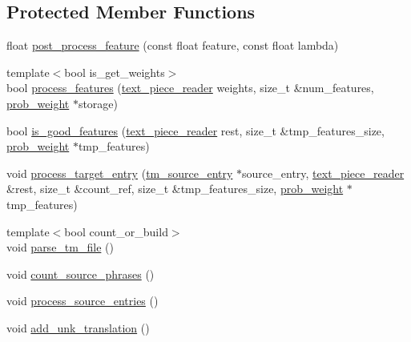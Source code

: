 \subsection*{Protected Member Functions}
\begin{DoxyCompactItemize}
\item 
float \hyperlink{classuva_1_1smt_1_1bpbd_1_1server_1_1tm_1_1builders_1_1tm__basic__builder_a55ed944c97e2e9896b6ada55899b9828}{post\+\_\+process\+\_\+feature} (const float feature, const float lambda)
\item 
{\footnotesize template$<$bool is\+\_\+get\+\_\+weights$>$ }\\bool \hyperlink{classuva_1_1smt_1_1bpbd_1_1server_1_1tm_1_1builders_1_1tm__basic__builder_ab0c3a3a7c88c9ebf39007bd0c8f213ad}{process\+\_\+features} (\hyperlink{classuva_1_1utils_1_1file_1_1text__piece__reader}{text\+\_\+piece\+\_\+reader} weights, size\+\_\+t \&num\+\_\+features, \hyperlink{namespaceuva_1_1smt_1_1bpbd_1_1server_a01e9ea4de9c226f4464862e84ff0bbcc}{prob\+\_\+weight} $\ast$storage)
\item 
bool \hyperlink{classuva_1_1smt_1_1bpbd_1_1server_1_1tm_1_1builders_1_1tm__basic__builder_af197ee4bc0a4b182cf3823cd6b4a127d}{is\+\_\+good\+\_\+features} (\hyperlink{classuva_1_1utils_1_1file_1_1text__piece__reader}{text\+\_\+piece\+\_\+reader} rest, size\+\_\+t \&tmp\+\_\+features\+\_\+size, \hyperlink{namespaceuva_1_1smt_1_1bpbd_1_1server_a01e9ea4de9c226f4464862e84ff0bbcc}{prob\+\_\+weight} $\ast$tmp\+\_\+features)
\item 
void \hyperlink{classuva_1_1smt_1_1bpbd_1_1server_1_1tm_1_1builders_1_1tm__basic__builder_aa4176dc8b7c74aebf387f6bd6d80ec72}{process\+\_\+target\+\_\+entry} (\hyperlink{classuva_1_1smt_1_1bpbd_1_1server_1_1tm_1_1models_1_1tm__source__entry}{tm\+\_\+source\+\_\+entry} $\ast$source\+\_\+entry, \hyperlink{classuva_1_1utils_1_1file_1_1text__piece__reader}{text\+\_\+piece\+\_\+reader} \&rest, size\+\_\+t \&count\+\_\+ref, size\+\_\+t \&tmp\+\_\+features\+\_\+size, \hyperlink{namespaceuva_1_1smt_1_1bpbd_1_1server_a01e9ea4de9c226f4464862e84ff0bbcc}{prob\+\_\+weight} $\ast$tmp\+\_\+features)
\item 
{\footnotesize template$<$bool count\+\_\+or\+\_\+build$>$ }\\void \hyperlink{classuva_1_1smt_1_1bpbd_1_1server_1_1tm_1_1builders_1_1tm__basic__builder_ae343a8c5d672c4c530f11eee3c19d3ee}{parse\+\_\+tm\+\_\+file} ()
\item 
void \hyperlink{classuva_1_1smt_1_1bpbd_1_1server_1_1tm_1_1builders_1_1tm__basic__builder_a3a746c653bfdbc8d5e8ad1b8393ba578}{count\+\_\+source\+\_\+phrases} ()
\item 
void \hyperlink{classuva_1_1smt_1_1bpbd_1_1server_1_1tm_1_1builders_1_1tm__basic__builder_ab815d0b80278bea0ab5fdc9a527fa6f2}{process\+\_\+source\+\_\+entries} ()
\item 
void \hyperlink{classuva_1_1smt_1_1bpbd_1_1server_1_1tm_1_1builders_1_1tm__basic__builder_a3990eaf128683fa52c8a43a1498bbf6c}{add\+\_\+unk\+\_\+translation} ()
\end{DoxyCompactItemize}


